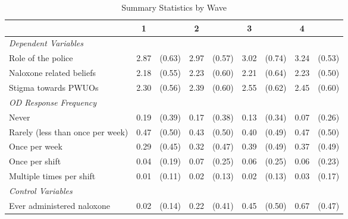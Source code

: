 \begin{table}[htbp]\centering
\def\sym#1{\ifmmode^{#1}\else\(^{#1}\)\fi}
\caption{\centering Summary Statistics by Wave}
\begin{tabular}{l*{4}{cc}}
\hline\hline
                &        1&         &        2&         &        3&         &        4&         \\
\hline
\emph{Dependent Variables}&         &         &         &         &         &         &         &         \\
\hspace{0.25cm} Role of the police&     2.87&   (0.63)&     2.97&   (0.57)&     3.02&   (0.74)&     3.24&   (0.53)\\
\hspace{0.25cm} Naloxone related beliefs&     2.18&   (0.55)&     2.23&   (0.60)&     2.21&   (0.64)&     2.23&   (0.50)\\
\hspace{0.25cm} Stigma towards PWUOs&     2.30&   (0.56)&     2.39&   (0.60)&     2.55&   (0.62)&     2.45&   (0.60)\\
\emph{OD Response Frequency}&         &         &         &         &         &         &         &         \\
\hspace{0.25cm} Never&     0.19&   (0.39)&     0.17&   (0.38)&     0.13&   (0.34)&     0.07&   (0.26)\\
\hspace{0.25cm} Rarely (less than once per week)&     0.47&   (0.50)&     0.43&   (0.50)&     0.40&   (0.49)&     0.47&   (0.50)\\
\hspace{0.25cm} Once per week&     0.29&   (0.45)&     0.32&   (0.47)&     0.39&   (0.49)&     0.37&   (0.49)\\
\hspace{0.25cm} Once per shift&     0.04&   (0.19)&     0.07&   (0.25)&     0.06&   (0.25)&     0.06&   (0.23)\\
\hspace{0.25cm} Multiple times per shift&     0.01&   (0.11)&     0.02&   (0.13)&     0.02&   (0.13)&     0.03&   (0.17)\\
\vspace{0.1em} \emph{Control Variables}&         &         &         &         &         &         &         &         \\
\hspace{0.25cm} Ever administered naloxone&     0.02&   (0.14)&     0.22&   (0.41)&     0.45&   (0.50)&     0.67&   (0.47)\\

\end{tabular}
\end{table}
